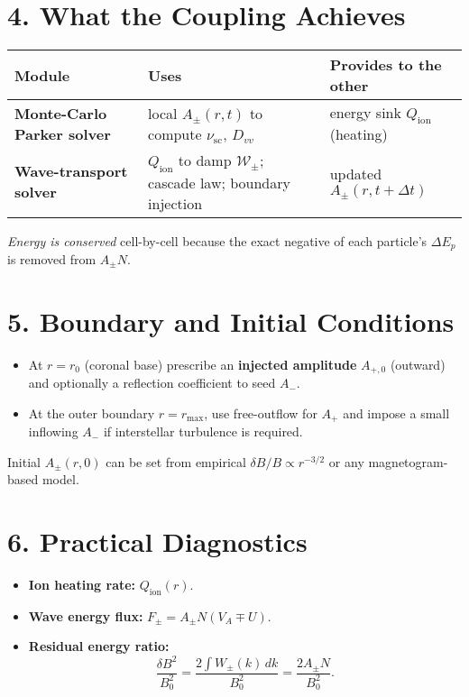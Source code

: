 \begin{tcolorbox}[colframe=black, colback=white, title=Step-by-Step Coupling Scheme]

\section*{4. What the Coupling Achieves}


\noindent
\begin{tabularx}{\textwidth}{@{}lXl@{}}
\toprule
\textbf{Module} & \textbf{Uses} & \textbf{Provides to the other} \\
\midrule
\textbf{Monte-Carlo Parker solver} & local \( A_\pm(r, t) \) to compute \( \nu_{\text{sc}} \), \( D_{vv} \) & energy sink \( Q_{\text{ion}} \) (heating) \\
\textbf{Wave-transport solver} & \( Q_{\text{ion}} \) to damp \( \mathcal{W}_\pm \); cascade law; boundary injection & updated \( A_\pm(r, t + \Delta t) \) \\
\bottomrule
\end{tabularx}


\medskip

\emph{Energy is conserved} cell-by-cell because the exact negative of each particle’s \( \Delta E_p \) is removed from \( A_\pm N \).

\section*{5. Boundary and Initial Conditions}

\begin{itemize}
    \item At \( r = r_0 \) (coronal base) prescribe an \textbf{injected amplitude} \( A_{+,0} \) (outward) and optionally a reflection coefficient to seed \( A_- \).
    \item At the outer boundary \( r = r_{\max} \), use free-outflow for \( A_+ \) and impose a small inflowing \( A_- \) if interstellar turbulence is required.
\end{itemize}

Initial \( A_\pm(r, 0) \) can be set from empirical \( \delta B / B \propto r^{-3/2} \) or any magnetogram-based model.

\section*{6. Practical Diagnostics}

\begin{itemize}
    \item \textbf{Ion heating rate:} \( Q_{\text{ion}}(r) \).
    \item \textbf{Wave energy flux:} \( F_\pm = A_\pm N (V_A \mp U) \).
    \item \textbf{Residual energy ratio:} 
    \[
    \frac{ \delta B^2 }{ B_0^2 } = \frac{ 2 \int W_\pm(k) \, dk }{ B_0^2 } = \frac{ 2 A_\pm N }{ B_0^2 }.
    \]
\end{itemize}


\end{tcolorbox}
